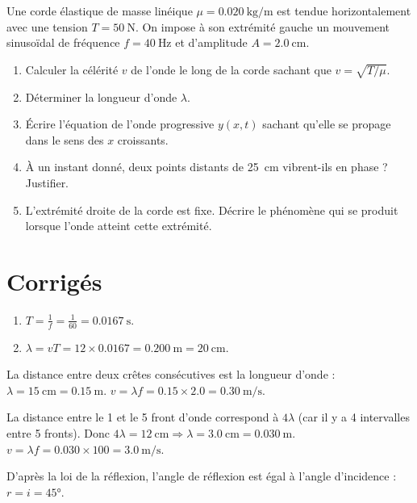 
Une corde élastique de masse linéique $\mu = \SI{0.020}{\kilo\gram\per\metre}$ est tendue horizontalement avec une tension $T = \SI{50}{\newton}$. On impose à son extrémité gauche un mouvement sinusoïdal de fréquence $f = \SI{40}{\hertz}$ et d'amplitude $A = \SI{2.0}{\centi\metre}$.

\begin{enumerate}
    \item Calculer la célérité $v$ de l'onde le long de la corde sachant que $v = \sqrt{T/\mu}$.
    \item Déterminer la longueur d'onde $\lambda$.
    \item Écrire l'équation de l'onde progressive $y(x,t)$ sachant qu'elle se propage dans le sens des $x$ croissants.
    \item À un instant donné, deux points distants de \SI{25}{\centi\metre} vibrent-ils en phase ? Justifier.
    \item L'extrémité droite de la corde est fixe. Décrire le phénomène qui se produit lorsque l'onde atteint cette extrémité.
\end{enumerate}

\section{Corrigés}

\begin{enumerate}
    \item $T = \frac{1}{f} = \frac{1}{60} = \SI{0.0167}{\second}$.
    \item $\lambda = vT = 12 \times 0.0167 = \SI{0.200}{\metre} = \SI{20}{\centi\metre}$.
\end{enumerate}

La distance entre deux crêtes consécutives est la longueur d'onde : $\lambda = \SI{15}{\centi\metre} = \SI{0.15}{\metre}$.
$v = \lambda f = 0.15 \times 2.0 = \SI{0.30}{\metre\per\second}$.

La distance entre le 1\ier{} et le 5\ieme{} front d'onde correspond à $4\lambda$ (car il y a 4 intervalles entre 5 fronts). Donc $4\lambda = \SI{12}{\centi\metre} \Rightarrow \lambda = \SI{3.0}{\centi\metre} = \SI{0.030}{\metre}$.
$v = \lambda f = 0.030 \times 100 = \SI{3.0}{\metre\per\second}$.

D'après la loi de la réflexion, l'angle de réflexion est égal à l'angle d'incidence : $r = i = \ang{45}$.

